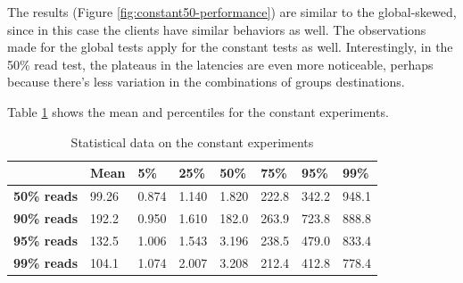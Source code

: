 The results (Figure \ref{fig:constant50-performance}) are similar to the global-skewed, since in this case the clients have similar behaviors as well. The observations made for the global tests apply for the constant tests as well. Interestingly, in the 50\% read test, the plateaus in the latencies are even more noticeable, perhaps because there's less variation in the combinations of groups destinations.

Table \ref{tab:constant-latencies-table} shows the mean and percentiles for the constant experiments.

\begin{table}[!htb]
  \centering
  \begin{tabular}{l l l l l l l l}
    \hline
    & \textbf{Mean} & \textbf{5\%} & \textbf{25\%} & \textbf{50\%} & \textbf{75\%} & \textbf{95\%}& \textbf{99\%} \\
    \hline
    \textbf{50\% reads} & 99.26 & 0.874 & 1.140 & 1.820 & 222.8 & 342.2 & 948.1 \\
    \textbf{90\% reads} & 192.2 & 0.950 & 1.610 & 182.0 & 263.9 & 723.8 & 888.8 \\
    \textbf{95\% reads} & 132.5 & 1.006 & 1.543 & 3.196 & 238.5 & 479.0 & 833.4 \\
    \textbf{99\% reads} & 104.1 & 1.074 & 2.007 & 3.208 & 212.4 & 412.8 & 778.4 \\
    \hline
  \end{tabular}
  \caption{Statistical data on the constant experiments}\label{tab:constant-latencies-table}
\end{table}


